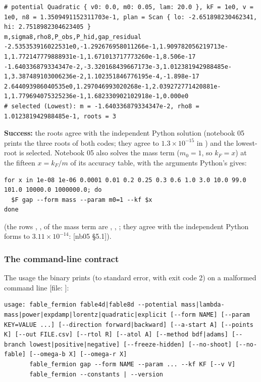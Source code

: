 \begin{Verbatim}
# potential Quadratic { v0: 0.0, m0: 0.05, lam: 20.0 }, kF = 1e0, v = 1e0, n8 = 1.3509491152311703e-1, plan = Scan { lo: -2.651898230462341, hi: 2.7518982304623405 }
m,sigma8,rho8,P_obs,P_hid,gap_residual
-2.535353916022531e0,-1.292676958011266e-1,1.909782056219713e-1,1.772147779888931e-1,1.671013717773260e-1,8.506e-17
-1.640336879334347e-2,-3.320168439667173e-3,1.012381942988485e-1,3.387489103006236e-2,1.102351846776195e-4,-1.898e-17
2.644093986040535e0,1.297046993020268e-1,2.039272771420881e-1,1.779694075325236e-1,1.682330902102918e-1,0.000e0
# selected (Lowest): m = -1.640336879334347e-2, rho8 = 1.012381942988485e-1, roots = 3
\end{Verbatim}

\textbf{Success:} the roots agree with the independent Python solution (notebook 05 prints the three roots of both codes; they agree to $1.3\times10^{-15}$ in ) and the lowest- root is selected. Notebook 05 also solves the mass term ($m_0 = 1$, so $k_F = x$) at the fifteen $x = k_F/m$ of its accuracy table, with the arguments Python's  gives:

\begin{Verbatim}
for x in 1e-08 1e-06 0.0001 0.01 0.2 0.25 0.3 0.6 1.0 3.0 10.0 99.0 101.0 10000.0 1000000.0; do
  $F gap --form mass --param m0=1 --kf $x
done
\end{Verbatim}

(the rows , ,  of the mass term are , , ; they agree with the independent Python forms to $3.11\times10^{-14}$:  [nb05 \S{}5.1]).

\subsubsection{The command-line contract}
\label{sec:6.4.5}

The usage the binary prints (to standard error, with exit code 2) on a malformed command line [file: ]:

\begin{Verbatim}
usage: fable_fermion fable4d|fable8d --potential mass|lambda-mass|power|expdamp|lorentz|quadratic|explicit [--form NAME] [--param KEY=VALUE ...] [--direction forward|backward] [--a-start A] [--points K] [--out FILE.csv] [--rtol R] [--atol A] [--method bdf|adams] [--branch lowest|positive|negative] [--freeze-hidden] [--no-shoot] [--no-fable] [--omega-b X] [--omega-r X]
       fable_fermion gap --form NAME --param ... --kf KF [--v V]
       fable_fermion --constants | --version
\end{Verbatim}

